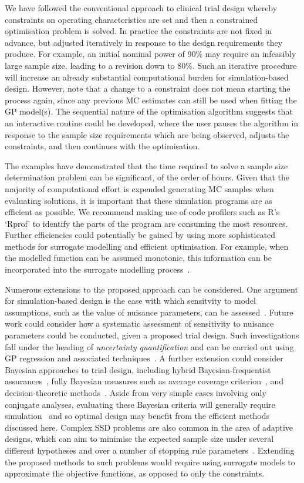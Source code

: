 \documentclass{article} %
\begin{document}
We have followed the conventional approach to clinical trial design whereby constraints on operating characteristics are set and then a constrained optimisation problem is solved. In practice the constraints are not fixed in advance, but adjusted iteratively in response to the design requirements they produce. For example, an initial nominal power of 90\% may require an infeasibly large sample size, leading to a revision down to 80\%. Such an iterative procedure will increase an already substantial computational burden for simulation-based design. However, note that a change to a constraint does not mean starting the process again, since any previous MC estimates can still be used when fitting the GP model(s). The sequential nature of the optimisation algorithm suggests that an interactive routine could be developed, where the user pauses the algorithm in response to the sample size requirements which are being observed, adjusts the constraints, and then continues with the optimisation.

The examples have demonstrated that the time required to solve a sample size determination problem can be significant, of the order of hours. Given that the majority of computational effort is expended generating MC samples when evaluating solutions, it is important that these simulation programs are as efficient as possible. We recommend making use of code profilers such as R's `Rprof' to identify the parts of the program  are consuming the most resources. Further efficiencies could potentially be gained by using more sophisticated methods for surrogate modelling and efficient optimisation. For example, when the modelled function can be assumed monotonic, this information can be incorporated into the surrogate modelling process~\cite{Emmerich2011}.

Numerous extensions to the proposed approach can be considered. One argument for simulation-based design is the ease with which sensitvity to model assumptions, such as the value of nuisance parameters, can be assessed~\cite{Landau2013}. Future work could consider how a systematic assessment of sensitivity to nuisance parameters could be conducted, given a proposed trial design. Such investigations fall under the heading of \emph{uncertainty quantification} and can be carried out using GP regression and associated techniques~\cite{Kennedy2001}. A further extension could consider Bayesian approaches to trial design, including hybrid Bayesian-frequentist assurances~\cite{OHagan2005}, fully Bayesian measures such as average coverage criterion~\cite{Cao2009}, and decision-theoretic methods~\cite{Oakley2010}. Aside from very simple cases involving only conjugate analyses, evaluating these Bayesian criteria will generally require simulation~\cite{OHagan2005} and so optimal design may benefit from the efficient methods discussed here. Complex SSD problems are also common in the area of adaptive designs, which can aim to minimise the expected sample size under several different hypotheses and over a number of stopping rule parameters~\cite{Wason2011, Wason2012}.  Extending the proposed methods to such problems would require using surrogate models to approximate the objective functions, as opposed to only the constraints.
\end{document}
